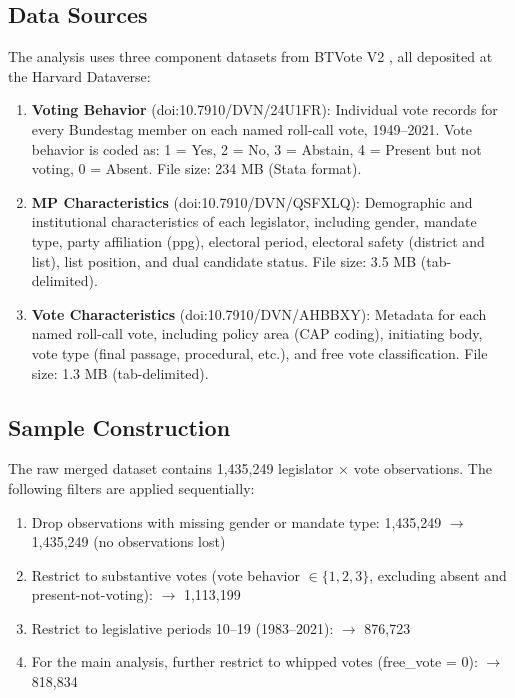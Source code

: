 \documentclass[12pt]{article}
\begin{document}
\subsection{Data Sources}

The analysis uses three component datasets from BTVote V2 \citep{btvote2023}, all deposited at the Harvard Dataverse:

\begin{enumerate}
\item \textbf{Voting Behavior} (doi:10.7910/DVN/24U1FR): Individual vote records for every Bundestag member on each named roll-call vote, 1949--2021. Vote behavior is coded as: 1 = Yes, 2 = No, 3 = Abstain, 4 = Present but not voting, 0 = Absent. File size: 234 MB (Stata format).

\item \textbf{MP Characteristics} (doi:10.7910/DVN/QSFXLQ): Demographic and institutional characteristics of each legislator, including gender, mandate type, party affiliation (ppg), electoral period, electoral safety (district and list), list position, and dual candidate status. File size: 3.5 MB (tab-delimited).

\item \textbf{Vote Characteristics} (doi:10.7910/DVN/AHBBXY): Metadata for each named roll-call vote, including policy area (CAP coding), initiating body, vote type (final passage, procedural, etc.), and free vote classification. File size: 1.3 MB (tab-delimited).
\end{enumerate}

\subsection{Sample Construction}

The raw merged dataset contains 1,435,249 legislator $\times$ vote observations. The following filters are applied sequentially:

\begin{enumerate}
\item Drop observations with missing gender or mandate type: 1,435,249 $\rightarrow$ 1,435,249 (no observations lost)
\item Restrict to substantive votes (vote behavior $\in \{1, 2, 3\}$, excluding absent and present-not-voting): $\rightarrow$ 1,113,199
\item Restrict to legislative periods 10--19 (1983--2021): $\rightarrow$ 876,723
\item For the main analysis, further restrict to whipped votes (free\_vote = 0): $\rightarrow$ 818,834
\end{enumerate}
\end{document}
